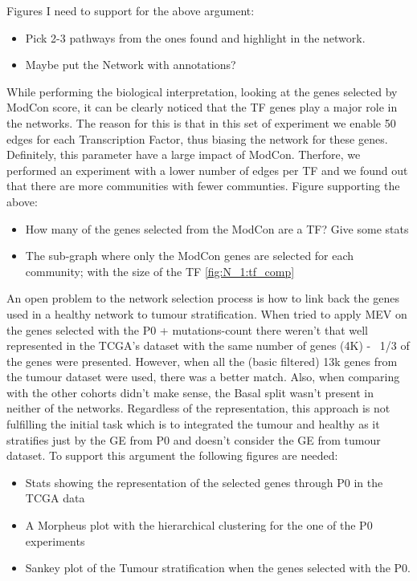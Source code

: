 Figures I need to support for the above argument:
\begin{itemize}
    \item Pick 2-3 pathways from the ones found and highlight in the network.
    \item Maybe put the Network with annotations?
\end{itemize}

While performing the biological interpretation, looking at the genes selected by ModCon score, it can be clearly noticed that the TF genes play a major role in the networks. The reason for this is that in this set of experiment we enable 50 edges for each Transcription Factor, thus biasing the network for these genes. Definitely, this parameter have a large impact of ModCon. Therfore, we performed an experiment with a lower number of edges per TF and we found out that there are more communities with fewer communties.
Figure supporting the above:
\begin{itemize}
    \item How many of the genes selected from the ModCon are a TF? Give some stats
    \item The sub-graph where only the ModCon genes are selected for each community; with the size of the TF \ref{fig:N_1:tf_comp}
\end{itemize}

An open problem to the network selection process is how to link back the genes used in a healthy network to tumour stratification. When tried to apply MEV on the genes selected with the P0 + mutations-count there weren't that well represented in the TCGA's dataset with the same number of genes (4K) - ~1/3 of the genes were presented. However, when all the (basic filtered) 13k genes from the tumour dataset were used, there was a better match. Also, when comparing with the other cohorts didn't make sense, the Basal split wasn't present in neither of the networks. Regardless of the representation, this approach is not fulfilling the initial task which is to integrated the tumour and healthy as it stratifies just by the GE from P0 and doesn't consider the GE from tumour dataset.
To support this argument the following figures are needed:
\begin{itemize}
    \item Stats showing the representation of the selected genes through P0 in the TCGA data
    \item A Morpheus plot with the hierarchical clustering for the one of the P0 experiments
    \item Sankey plot of the Tumour stratification when the genes selected with the P0.
\end{itemize}


